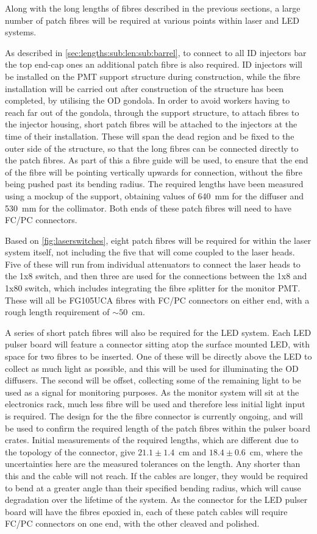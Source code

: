 \documentclass[a4paper,11pt]{article}
\let\oldsim\sim
\renewcommand{\sim}{{\oldsim}}
\begin{document}
Along with the long lengths of fibres described in the previous sections, a large number of patch fibres will be required at various points within laser and LED systems.

As described in \cref{sec:lengths:sub:len:sub:barrel}, to connect to all ID injectors bar the top end-cap ones an additional patch fibre is also required. ID injectors will be installed on the PMT support structure during construction, while the fibre installation will be carried out after construction of the structure has been completed, by utilising the OD gondola. In order to avoid workers having to reach far out of the gondola, through the support structure, to attach fibres to the injector housing, short patch fibres will be attached to the injectors at the time of their installation. These will span the dead region and be fixed to the outer side of the structure, so that the long fibres can be connected directly to the patch fibres. As part of this a fibre guide will be used, to ensure that the end of the fibre will be pointing vertically upwards for connection, without the fibre being pushed past its bending radius. The required lengths have been measured using a mockup of the support, obtaining values of 640~mm for the diffuser and 530~mm for the collimator. Both ends of these patch fibres will need to have FC/PC connectors.

Based on \cref{fig:laserswitches}, eight patch fibres will be required for within the laser system itself, not including the five that will come coupled to the laser heads. Five of these will run from individual attenuators to connect the laser heads to the 1x8 switch, and then three are used for the connections between the 1x8 and 1x80 switch, which includes integrating the fibre splitter for the monitor PMT. These will all be FG105UCA fibres with FC/PC connectors on either end, with a rough length requirement of $\sim50$~cm.

A series of short patch fibres will also be required for the LED system. Each LED pulser board will feature a connector sitting atop the surface mounted LED, with space for two fibres to be inserted. One of these will be directly above the LED to collect as much light as possible, and this will be used for illuminating the OD diffusers. The second will be offset, collecting some of the remaining light to be used as a signal for monitoring purposes. As the monitor system will sit at the electronics rack, much less fibre will be used and therefore less initial light input is required. The design for the the fibre connector is currently ongoing, and will be used to confirm the required length of the patch fibres within the pulser board crates. Initial measurements of the required lengths, which are different due to the topology of the connector, give $21.1\pm1.4$~cm and $18.4\pm0.6$~cm, where the uncertainties here are the measured tolerances on the length. Any shorter than this and the cable will not reach. If the cables are longer, they would be required to bend at a greater angle than their specified bending radius, which will cause degradation over the lifetime of the system. As the connector for the LED pulser board will have the fibres epoxied in, each of these patch cables will require FC/PC connectors on one end, with the other cleaved and polished.
\end{document}
